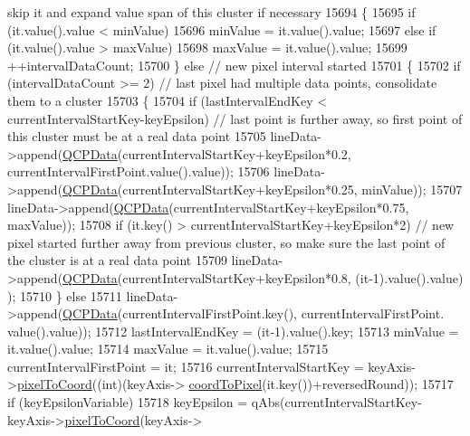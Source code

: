 \begin{DoxyCode}
{       skip it and expand value span of this cluster if necessary}
15694         \{
15695           \textcolor{keywordflow}{if} (it.value().value < minValue)
15696             minValue = it.value().value;
15697           \textcolor{keywordflow}{else} \textcolor{keywordflow}{if} (it.value().value > maxValue)
15698             maxValue = it.value().value;
15699           ++intervalDataCount;
15700         \} \textcolor{keywordflow}{else} \textcolor{comment}{// new pixel interval started}
15701         \{
15702           \textcolor{keywordflow}{if} (intervalDataCount >= 2) \textcolor{comment}{// last pixel had multiple data points, consolidate them to a cluster}
15703           \{
15704             \textcolor{keywordflow}{if} (lastIntervalEndKey < currentIntervalStartKey-keyEpsilon) \textcolor{comment}{// last point is further away, so
       first point of this cluster must be at a real data point}
15705               lineData->append(\hyperlink{class_q_c_p_data}{QCPData}(currentIntervalStartKey+keyEpsilon*0.2, 
      currentIntervalFirstPoint.value().value));
15706             lineData->append(\hyperlink{class_q_c_p_data}{QCPData}(currentIntervalStartKey+keyEpsilon*0.25, minValue));
15707             lineData->append(\hyperlink{class_q_c_p_data}{QCPData}(currentIntervalStartKey+keyEpsilon*0.75, maxValue));
15708             \textcolor{keywordflow}{if} (it.key() > currentIntervalStartKey+keyEpsilon*2) \textcolor{comment}{// new pixel started further away from
       previous cluster, so make sure the last point of the cluster is at a real data point}
15709               lineData->append(\hyperlink{class_q_c_p_data}{QCPData}(currentIntervalStartKey+keyEpsilon*0.8, (it-1).value().value)
      );
15710           \} \textcolor{keywordflow}{else}
15711             lineData->append(\hyperlink{class_q_c_p_data}{QCPData}(currentIntervalFirstPoint.key(), currentIntervalFirstPoint.
      value().value));
15712           lastIntervalEndKey = (it-1).value().key;
15713           minValue = it.value().value;
15714           maxValue = it.value().value;
15715           currentIntervalFirstPoint = it;
15716           currentIntervalStartKey = keyAxis->\hyperlink{class_q_c_p_axis_ae9289ef7043b9d966af88eaa95b037d1}{pixelToCoord}((\textcolor{keywordtype}{int})(keyAxis->
      \hyperlink{class_q_c_p_axis_a985ae693b842fb0422b4390fe36d299a}{coordToPixel}(it.key())+reversedRound));
15717           \textcolor{keywordflow}{if} (keyEpsilonVariable)
15718             keyEpsilon = qAbs(currentIntervalStartKey-keyAxis->\hyperlink{class_q_c_p_axis_ae9289ef7043b9d966af88eaa95b037d1}{pixelToCoord}(keyAxis->

\end{DoxyCode}
